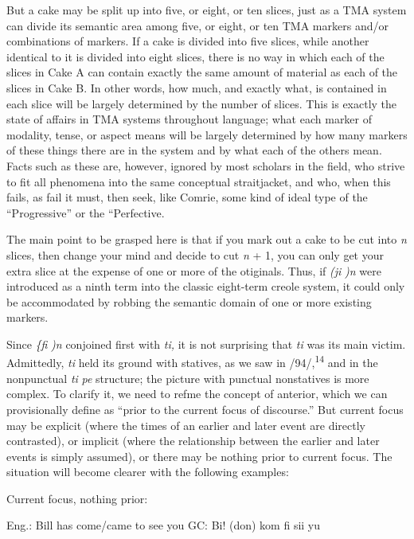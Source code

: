 But a cake may be split up into five, or eight, or ten slices, just as a TMA system can divide its semantic area among five, or eight, or ten TMA markers and/or combinations of markers. If a cake is divided into five slices, while another identical to it is divided into eight slices, there is no way in which each of the slices in Cake A can contain exactly the same amount of material as each of the slices in Cake B. In other words, how much, and exactly what, is contained in each slice will be largely determined by the number of slices. This is exactly the state of affairs in TMA systems throughout language; what each marker of modality, tense, or aspect means will be largely determined by how many markers of these things there are in the system and by what each of the others mean. Facts such as these are, however, ignored by most scholars in the field, who strive to fit all phenomena into the same conceptual straitjacket, and who, when
this fails, as fail it must, then seek, like Comrie, some kind of ideal type of the ``Progressive'' or the ``Perfective.{\textquotedbl}

The main point to be grasped here is that if you mark out a cake
to be cut into \textit{n} slices, then change your mind and decide to cut \textit{n} + 1, you can only get your extra slice at the expense of one or more of the otiginals. Thus, if \textit{(ji} \textit{)n} were introduced as a ninth term into the classic eight-term creole system, it could only be accommodated by robbing the semantic domain of one or more existing markers.

Since \textit{\{}\textit{fi} \textit{)n }conjoined first with \textit{ti,} it is not surprising that \textit{ti} was
its main victim. Admittedly, \textit{ti} held its ground with statives, as we saw in /94/,\textsuperscript{1}\textsuperscript{4} and in the nonpunctual \textit{ti} \textit{pe} structure; the picture with punctual nonstatives is more complex. To clarify it, we need to refme the concept of anterior, which we can provisionally define as ``prior to the current focus of discourse.'' But current focus may be explicit (where the times of an earlier and later event are directly contrasted),
or implicit (where the relationship between the earlier and later events is simply assumed), or there may be nothing prior to current focus.
The situation will become clearer with the following examples:

\ea\label{ex:103}
 Current focus, nothing prior:
\glt
\z

Eng.: Bill has come/came to see you GC: Bi! (don) kom fi sii yu

